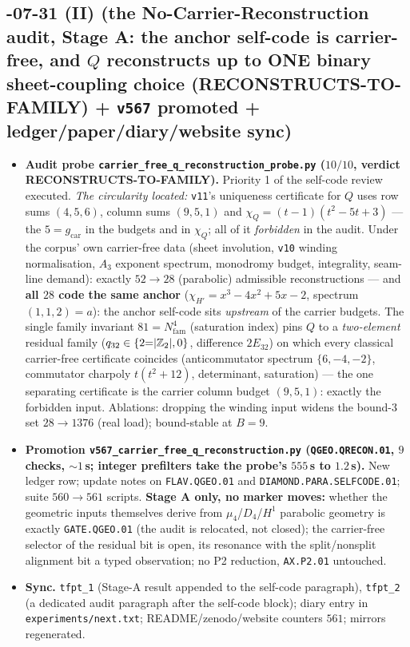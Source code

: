\documentclass[11pt]{article}
\providecommand{\vref}[1]{\texttt{#1}}
\begin{document}
\subsection*{-07-31 (II) (the No-Carrier-Reconstruction audit, Stage A: the anchor self-code is carrier-free, and $Q$ reconstructs up to ONE binary sheet-coupling choice (RECONSTRUCTS-TO-FAMILY) + \texttt{v567} promoted + ledger/paper/diary/website sync)}
\begin{itemize}[leftmargin=1.5em]
\item \textbf{Audit probe \texttt{carrier\_free\_q\_reconstruction\_probe.py} ($10/10$, verdict
RECONSTRUCTS-TO-FAMILY).} Priority 1 of the self-code review executed.  \emph{The circularity
located:} \vref{v11}'s uniqueness certificate for $Q$ uses row sums $(4,5,6)$, column sums
$(9,5,1)$ and $\chi_Q=(t{-}1)(t^2{-}5t{+}3)$ --- the $5=g_{\mathrm{car}}$ in the budgets and in
$\chi_Q$; all of it \emph{forbidden} in the audit.  Under the corpus' own carrier-free data
(sheet involution, \vref{v10} winding normalisation, $A_3$ exponent spectrum, monodromy budget,
integrality, seam-line demand): exactly $52\to28$ (parabolic) admissible reconstructions --- and
\textbf{all $28$ code the same anchor} ($\chi_{H'}=x^3-4x^2+5x-2$, spectrum $(1,1,2)=a$): the
anchor self-code sits \emph{upstream} of the carrier budgets.  The single family invariant
$81=N_{\mathrm{fam}}^4$ (saturation index) pins $Q$ to a \emph{two-element} residual family
($q_{32}\in\{2{=}|\mathbb{Z}_2|,0\}$, difference $2E_{32}$) on which every classical carrier-free
certificate coincides (anticommutator spectrum $\{6,-4,-2\}$, commutator charpoly $t(t^2{+}12)$,
determinant, saturation) --- the one separating certificate is the carrier column budget
$(9,5,1)$: exactly the forbidden input.  Ablations: dropping the winding input widens the
bound-$3$ set $28\to1376$ (real load); bound-stable at $B=9$.
\item \textbf{Promotion \texttt{v567\_carrier\_free\_q\_reconstruction.py}
(\texttt{QGEO.QRECON.01}, $9$ checks, ${\sim}1$\,s; integer prefilters take the probe's $555$\,s
to $1.2$\,s).} New ledger row; update notes on \texttt{FLAV.QGEO.01} and
\texttt{DIAMOND.PARA.SELFCODE.01}; suite $560\to561$ scripts.  \textbf{Stage A only, no marker
moves:} whether the geometric inputs themselves derive from $\mu_4$/$D_4$/$H^1$ parabolic
geometry is exactly \texttt{GATE.QGEO.01} (the audit is relocated, not closed); the carrier-free
selector of the residual bit is open, its resonance with the split/nonsplit alignment bit a typed
observation; no P2 reduction, \texttt{AX.P2.01} untouched.
\item \textbf{Sync.} \texttt{tfpt\_1} (Stage-A result appended to the self-code paragraph),
\texttt{tfpt\_2} (a dedicated audit paragraph after the self-code block); diary entry in
\texttt{experiments/next.txt}; README/zenodo/website counters $561$; mirrors regenerated.
\end{itemize}
\end{document}
